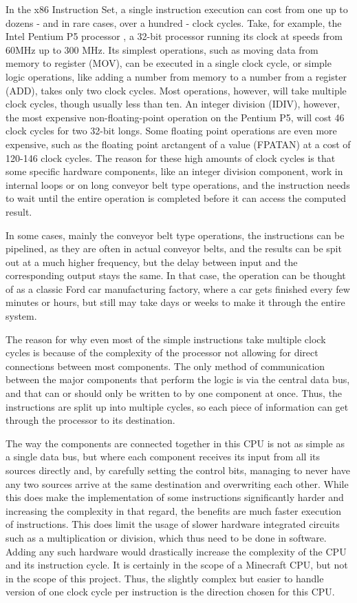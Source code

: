 In the x86 Instruction Set, a single instruction execution can cost from one up to dozens - and in rare cases, over a hundred - clock cycles. Take, for example, the Intel Pentium P5 processor \cite[Page 162 - Intel Pentium]{InstrTable_Agner}, a 32-bit processor running its clock at speeds from 60MHz up to 300 MHz. Its simplest operations, such as moving data from memory to register (MOV), can be executed in a single clock cycle, or simple logic operations, like adding a number from memory to a number from a register (ADD), takes only two clock cycles. Most operations, however, will take multiple clock cycles, though usually less than ten. An integer division (IDIV), however, the most expensive non-floating-point operation on the Pentium P5, will cost 46 clock cycles for two 32-bit longs. Some floating point operations are even more expensive, such as the floating point arctangent of a value (FPATAN) at a cost of 120-146 clock cycles. The reason for these high amounts of clock cycles is that some specific hardware components, like an integer division component, work in internal loops or on long conveyor belt type operations, and the instruction needs to wait until the entire operation is completed before it can access the computed result.

In some cases, mainly the conveyor belt type operations, the instructions can be pipelined, as they are often in actual conveyor belts, and the results can be spit out at a much higher frequency, but the delay between input and the corresponding output stays the same. In that case, the operation can be thought of as a classic Ford car manufacturing factory, where a car gets finished every few minutes or hours, but still may take days or weeks to make it through the entire system.

The reason for why even most of the simple instructions take multiple clock cycles is because of the complexity of the processor not allowing for direct connections between most components. The only method of communication between the major components that perform the logic is via the central data bus, and that can or should only be written to by one component at once. Thus, the instructions are split up into multiple cycles, so each piece of information can get through the processor to its destination.

The way the components are connected together in this CPU is not as simple as a single data bus, but where each component receives its input from all its sources directly and, by carefully setting the control bits, managing to never have any two sources arrive at the same destination and overwriting each other. While this does make the implementation of some instructions significantly harder and increasing the complexity in that regard, the benefits are much faster execution of instructions. This does limit the usage of slower hardware integrated circuits such as a multiplication or division, which thus need to be done in software. Adding any such hardware would drastically increase the complexity of the CPU and its instruction cycle. It is certainly in the scope of a Minecraft CPU, but not in the scope of this project. Thus, the slightly complex but easier to handle version of one clock cycle per instruction is the direction chosen for this CPU.

